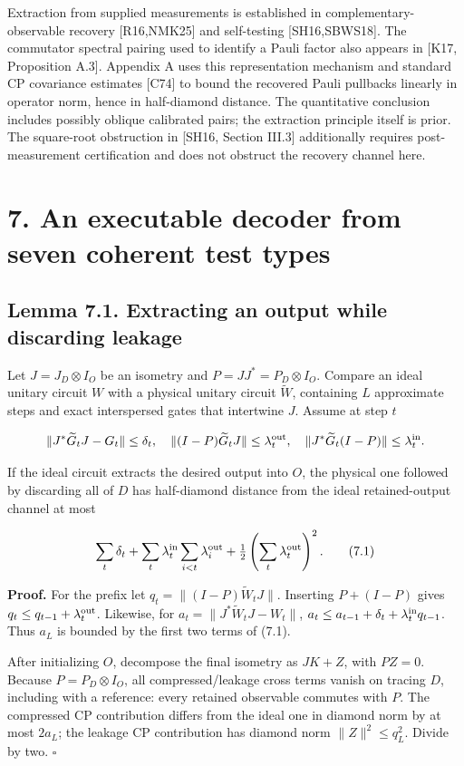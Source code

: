 \documentclass[11pt]{article}
\begin{document}
Extraction from supplied measurements is established in complementary-observable
recovery [R16,NMK25] and self-testing [SH16,SBWS18]. The commutator spectral
pairing used to identify a Pauli factor also appears in [K17, Proposition A.3].
Appendix A uses this representation mechanism and standard CP covariance
estimates [C74] to bound the recovered Pauli pullbacks linearly in operator
norm, hence in half-diamond distance. The quantitative conclusion includes
possibly oblique calibrated pairs; the extraction principle itself is prior.
The square-root obstruction in [SH16, Section III.3] additionally requires
post-measurement certification and does not obstruct the recovery channel here.

\section*{7. An executable decoder from seven coherent test types}

\subsection*{Lemma 7.1. Extracting an output while discarding leakage}

Let \(J=J_D\otimes I_O\) be an isometry and \(P=JJ^*=P_D\otimes I_O\).
Compare an ideal unitary circuit \(W\) with a physical unitary circuit
\(\widetilde W\), containing \(L\) approximate steps and exact interspersed
gates that intertwine \(J\). Assume at step \(t\)

\[
\|J^*\widetilde G_tJ-G_t\|\le\delta_t,\quad
\|(I-P)\widetilde G_tJ\|\le\lambda_t^{\rm out},\quad
\|J^*\widetilde G_t(I-P)\|\le\lambda_t^{\rm in}.
\]

If the ideal circuit extracts the desired output into \(O\), the physical
one followed by discarding all of \(D\) has half-diamond distance from the
ideal retained-output channel at most

\[
\sum_t\delta_t+
\sum_t\lambda_t^{\rm in}\sum_{i<t}\lambda_i^{\rm out}
+\tfrac12\left(\sum_t\lambda_t^{\rm out}\right)^2.
\tag{7.1}
\]

\textbf{Proof.} For the prefix let
\(q_t=\|(I-P)\widetilde W_tJ\|\). Inserting \(P+(I-P)\) gives
\(q_t\le q_{t-1}+\lambda_t^{\rm out}\). Likewise, for
\(a_t=\|J^*\widetilde W_tJ-W_t\|\),
\(a_t\le a_{t-1}+\delta_t+\lambda_t^{\rm in}q_{t-1}\).
Thus \(a_L\) is bounded by the first two terms of (7.1).

After initializing \(O\), decompose the final isometry as \(JK+Z\), with
\(PZ=0\). Because \(P=P_D\otimes I_O\), all compressed/leakage cross
terms vanish on tracing \(D\), including with a reference: every retained
observable commutes with \(P\). The compressed CP contribution differs
from the ideal one in diamond norm by at most \(2a_L\); the leakage CP
contribution has diamond norm \(\|Z\|^2\le q_L^2\). Divide by two. \hfill\(\square\)
\end{document}
